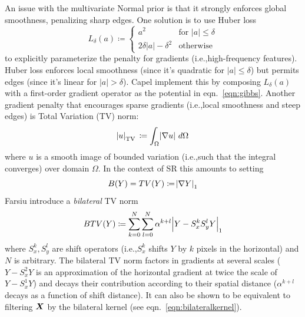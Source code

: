 An issue with the multivariate Normal prior is that it strongly enforces global smoothness, penalizing sharp edges.
%
One solution is to use Huber loss\cite{huber1964}
\begin{equation}
    L_{\delta }(a)\coloneqq {
        \begin{cases}
            a^2                                 & \text{for }\lvert a \rvert \leq \delta \\
            2 \delta \lvert a \rvert - \delta^2 & {\text{otherwise}}
        \end{cases}
    }
\end{equation}
to explicitly parameterize the penalty for gradients (i.e.,high-frequency features).
%
Huber loss enforces local smoothness (since it's quadratic for \(\lvert a \rvert \leq \delta\)) but permits edges (since it's linear for \(\lvert a \rvert > \delta\)).
%
Capel \etal\cite{capel2000} implement this by composing \(L_{\delta }(a)\) with a first-order gradient operator as the potential in eqn.~\eqref{eqn:gibbs}.
%
Another gradient penalty that encourages sparse gradients (i.e.,local smoothness and steep edges) is Total Variation (TV) norm\cite{RUDIN1992259}:
\begin{equation}
    \abs{u}_{\operatorname {TV}}\,\coloneqq\int _{\Omega }\abs{\nabla u}\,d\Omega
\end{equation}
where \(u\) is a smooth image of bounded variation (i.e.,such that the integral converges) over domain \(\Omega\).
%
In the context of SR this amounts to setting
\begin{equation}
    B(Y) = TV(Y) \coloneqq \abs{ \nabla Y }_1
\end{equation}
%
Farsiu \etal\cite{farsiu} introduce a \textit{bilateral} TV norm
\begin{equation}
    BTV(Y) \coloneqq \sum_{k=0}^{N} \sum_{l=0}^{N} \alpha^{k + l} \abs{ Y - S_x^k S_y^l Y }_1
\end{equation}
where \(S_x^k, S_y^l\) are shift operators (i.e.,\(S_x^k\) shifts \(Y\) by \(k\) pixels in the horizontal) and \(N\) is arbitrary.
%
The bilateral TV norm factors in gradients at several scales (\(Y - S_x^2 Y\) is an approximation of the horizontal gradient at twice the scale of \(Y - S_x^1 Y\)) and decays their contribution according to their spatial distance (\(\alpha^{k+l}\) decays as a function of shift distance).
%
It can also be shown to be equivalent\cite{elad2002} to filtering \(\bm{X}\) by the bilateral kernel (see eqn.~\eqref{eqn:bilateralkernel}).

